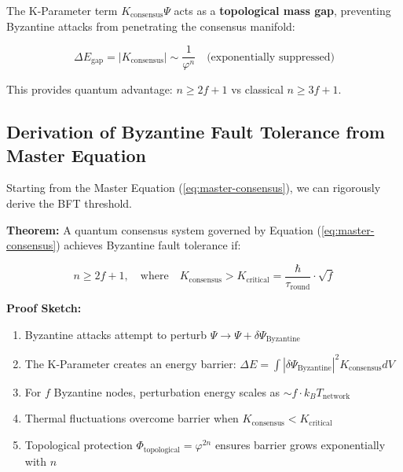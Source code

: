 \documentclass[11pt,a4paper]{article}
\begin{document}
The K-Parameter term $K_{\text{consensus}}\Psi$ acts as a \textbf{topological mass gap}, preventing Byzantine attacks from penetrating the consensus manifold:

\begin{equation}
\Delta E_{\text{gap}} = |K_{\text{consensus}}| \sim \frac{1}{\varphi^n} \quad \text{(exponentially suppressed)}
\end{equation}

This provides quantum advantage: $n \geq 2f+1$ vs classical $n \geq 3f+1$.

\subsection{Derivation of Byzantine Fault Tolerance from Master Equation}

Starting from the Master Equation (\ref{eq:master-consensus}), we can rigorously derive the BFT threshold.

\begin{tcolorbox}[colback=quantumblue!10,colframe=quantumblue,title=\textbf{Theorem 1: Quantum BFT Threshold from K-Parameter}]
\textbf{Theorem:} A quantum consensus system governed by Equation (\ref{eq:master-consensus}) achieves Byzantine fault tolerance if:

\begin{equation}
n \geq 2f + 1, \quad \text{where} \quad K_{\text{consensus}} > K_{\text{critical}} = \frac{\hbar}{\tau_{\text{round}}} \cdot \sqrt{f}
\end{equation}

\textbf{Proof Sketch:}
\begin{enumerate}
    \item Byzantine attacks attempt to perturb $\Psi \to \Psi + \delta\Psi_{\text{Byzantine}}$
    \item The K-Parameter creates an energy barrier: $\Delta E = \int |\delta\Psi_{\text{Byzantine}}|^2 K_{\text{consensus}} dV$
    \item For $f$ Byzantine nodes, perturbation energy scales as $\sim f \cdot k_B T_{\text{network}}$
    \item Thermal fluctuations overcome barrier when $K_{\text{consensus}} < K_{\text{critical}}$
    \item Topological protection $\Phi_{\text{topological}} = \varphi^{2n}$ ensures barrier grows exponentially with $n$
\end{enumerate}
\end{tcolorbox}
\end{document}
